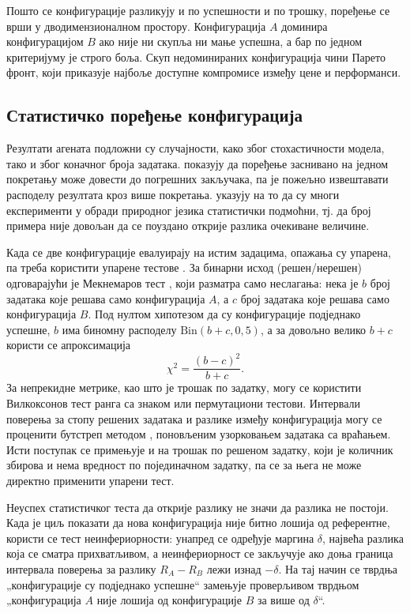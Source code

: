 \documentclass[12pt,a4paper]{report}
\begin{document}
	Пошто се конфигурације разликују и по успешности и по трошку, поређење се
	врши у дводимензионалном простору. Конфигурација $A$ доминира
	конфигурацијом $B$ ако није ни скупља ни мање успешна, а бар по једном
	критеријуму је строго боља. Скуп недоминираних конфигурација чини
	Парето фронт, који приказује најбоље доступне компромисе између цене и
	перформанси.

	\subsection{Статистичко поређење конфигурација}

	Резултати агената подложни су случајности, како због стохастичности модела,
	тако и због коначног броја задатака. \textcite{reimers2017distributions}
	показују да поређење заснивано на једном покретању може довести до
	погрешних закључака, па је пожељно извештавати расподелу резултата кроз
	више покретања. \textcite{card2020littlepower} указују на то да су многи
	експерименти у обради природног језика статистички подмоћни, тј. да број
	примера није довољан да се поуздано открије разлика очекиване величине.

	Када се две конфигурације евалуирају на истим задацима, опажања су
	упарена, па треба користити упарене тестове \parencite{dror2018hitchhiker}.
	За бинарни исход (решен/нерешен) одговарајући је Мекнемаров тест
	\parencite{mcnemar1947}, који разматра само неслагања: нека је $b$ број
	задатака које решава само конфигурација $A$, а $c$ број задатака које
	решава само конфигурација $B$. Под нултом хипотезом да су конфигурације
	подједнако успешне, $b$ има биномну расподелу $\mathrm{Bin}(b + c, 0{,}5)$,
	а за довољно велико $b + c$ користи се апроксимација
	\begin{equation}
		\chi^2 = \frac{(b - c)^2}{b + c}.
	\end{equation}
	За непрекидне метрике, као што је трошак по задатку, могу се користити
	Вилкоксонов тест ранга са знаком или пермутациони тестови. Интервали
	поверења за стопу решених задатака и разлике између конфигурација могу
	се проценити бутстреп методом \parencite{efron1993bootstrap}, поновљеним
	узорковањем задатака са враћањем. Исти поступак се примењује и на трошак по
	решеном задатку, који је количник збирова и нема вредност по појединачном
	задатку, па се за њега не може директно применити упарени тест.

	Неуспех статистичког теста да открије разлику не значи да разлика не
	постоји. Када је циљ показати да нова конфигурација није битно лошија од
	референтне, користи се тест неинфериорности: унапред се одређује маргина
	$\delta$, највећа разлика која се сматра прихватљивом, а неинфериорност се
	закључује ако доња граница интервала поверења за разлику $R_A - R_B$ лежи
	изнад $-\delta$. На тај начин се тврдња „конфигурације су подједнако
	успешне“ замењује проверљивом тврдњом „конфигурација $A$ није лошија од
	конфигурације $B$ за више од $\delta$“.
	
\end{document}
